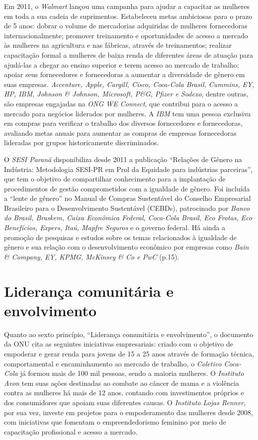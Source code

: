 Em 2011, o \emph{Walmart} lançou uma campanha para ajudar a capacitar as
mulheres em toda a sua cadeia de suprimentos. Estabeleceu metas
ambiciosas para o prazo de 5 anos: dobrar o volume de mercadorias
adquiridas de mulheres fornecedoras internacionalmente; promover
treinamento e oportunidades de acesso a mercado às mulheres na
agricultura e nas fábricas, através de treinamentos; realizar
capacitação formal a mulheres de baixa renda de diferentes áreas de
atuação para ajudá-las a chegar ao ensino superior e terem acesso ao
mercado de trabalho; apoiar seus fornecedores e fornecedoras a aumentar
a diversidade de gênero em suas empresas. \emph{Accenture, Apple,
Cargill, Cisco, Coca-Cola Brasil, Cummins, EY, HP, IBM, Johnson \&
Johnson, Microsoft, P\&G, Pfizer e Sodexo}, dentre outras, são empresas
engajadas na \emph{ONG WE Connect}, que contribui para o acesso a
mercado para negócios liderados por mulheres. A \emph{IBM} tem uma
pessoa exclusiva em compras para verificar o trabalho dos diversos
fornecedores e fornecedoras, avaliando metas anuais para aumentar as
compras de empresas fornecedoras lideradas por grupos historicamente
discriminados.

O \emph{SESI Paraná} disponibiliza desde 2011 a publicação ``Relações de
Gênero na Indústria: Metodologia SESI-PR em Prol da Equidade para
indústrias parceiras'', que tem o objetivo de compartilhar conhecimento
para a implantação de procedimentos de gestão comprometidos com a
igualdade de gênero. Foi incluída a ``lente de gênero'' no Manual de
Compras Sustentável do Conselho Empresarial Brasileiro para o
Desenvolvimento Sustentável (CEBDs), patrocinado por \emph{Banco do
Brasil, Braskem, Caixa Econômica Federal, Coca-Cola Brasil, Eco Frotas,
Eco Benefícios, Expers, Itaú, Mapfre Seguros} e o governo federal. Há
ainda a promoção de pesquisas e estudos sobre os temas relacionados à
igualdade de gênero e sua relação com o desenvolvimento econômico por
empresas como \emph{Bain \& Company, EY, KPMG, McKinsey \& Co e PwC}
(p.15).

\section{Liderança comunitária e envolvimento}

Quanto ao sexto princípio, ``Liderança comunitária e envolvimento'', o
documento da ONU cita as seguintes iniciativas empresariais: criado com
o objetivo de empoderar e gerar renda para jovens de 15 a 25 anos
através de formação técnica, comportamental e encaminhamento ao mercado
de trabalho, o \emph{Coletivo Coca-Cola} já formou mais de 100 mil
pessoas, sendo a maioria mulheres. O \emph{Instituto Avon} tem suas
ações destinadas ao combate ao câncer de mama e a violência contra as
mulheres há mais de 12 anos, contando com investimentos próprios e dos
consumidores que apoiam suas diferentes causas. O \emph{Instituto Lojas
Renner}, por sua vez, investe em projetos para o empoderamento das
mulheres desde 2008, com iniciativas que fomentam o empreendedorismo
feminino por meio de capacitação profissional e acesso a mercado.

